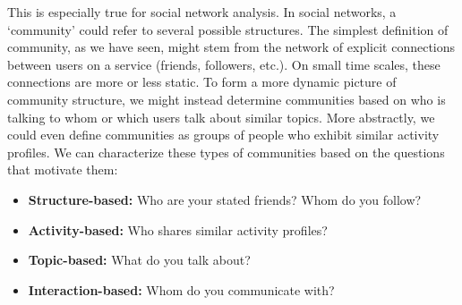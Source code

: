 This is especially true for social network analysis. In social networks, a `community' could refer to several possible structures. The simplest definition of community, as we have seen, might stem from the network of explicit connections between users on a service (friends, followers, etc.). On small time scales, these connections are more or less static. To form a more dynamic picture of community structure, we might instead determine communities based on who is talking to whom or which users talk about similar topics.
More abstractly, we could even define communities as groups of people who exhibit similar activity profiles. We can characterize these types of communities based on the questions that motivate them:
\begin{itemize}
	\item \textbf{Structure-based:} Who are your stated friends? Whom do you follow?
	\item \textbf{Activity-based:} Who shares similar activity profiles?
	\item \textbf{Topic-based:} What do you talk about?
	\item \textbf{Interaction-based:} Whom do you communicate with?
\end{itemize}

